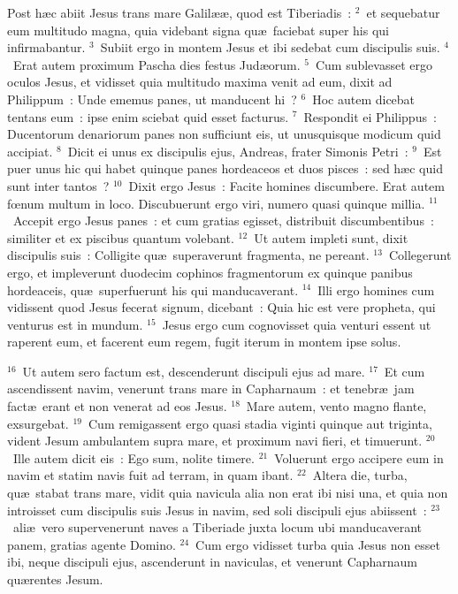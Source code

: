 \lettrine[lines=3,image=true,loversize=0.05,lraise=-0.03]{P}{}ost h\ae c abiit Jesus trans mare Galil\ae \ae , quod est Tiberiadis~:
${}^{2}$~et sequebatur eum multitudo magna, quia videbant signa qu\ae\ faciebat super his qui infirmabantur.
${}^{3}$~Subiit ergo in montem Jesus et ibi sedebat cum discipulis suis.
${}^{4}$~Erat autem proximum Pascha dies festus Jud\ae orum.
${}^{5}$~Cum sublevasset ergo oculos Jesus, et vidisset quia multitudo maxima venit ad eum, dixit ad Philippum~: Unde ememus panes, ut manducent hi~?
${}^{6}$~Hoc autem dicebat tentans eum~: ipse enim sciebat quid esset facturus.
${}^{7}$~Respondit ei Philippus~: Ducentorum denariorum panes non sufficiunt eis, ut unusquisque modicum quid accipiat.
${}^{8}$~Dicit ei unus ex discipulis ejus, Andreas, frater Simonis Petri~:
${}^{9}$~Est puer unus hic qui habet quinque panes hordeaceos et duos pisces~: sed h\ae c quid sunt inter tantos~?
${}^{10}$~Dixit ergo Jesus~: Facite homines discumbere. Erat autem fœnum multum in loco. Discubuerunt ergo viri, numero quasi quinque millia.
${}^{11}$~Accepit ergo Jesus panes~: et cum gratias egisset, distribuit discumbentibus~: similiter et ex piscibus quantum volebant.
${}^{12}$~Ut autem impleti sunt, dixit discipulis suis~: Colligite qu\ae\ superaverunt fragmenta, ne pereant.
${}^{13}$~Collegerunt ergo, et impleverunt duodecim cophinos fragmentorum ex quinque panibus hordeaceis, qu\ae\ superfuerunt his qui manducaverant.
${}^{14}$~Illi ergo homines cum vidissent quod Jesus fecerat signum, dicebant~: Quia hic est vere propheta, qui venturus est in mundum.
${}^{15}$~Jesus ergo cum cognovisset quia venturi essent ut raperent eum, et facerent eum regem, fugit iterum in montem ipse solus.


${}^{16}$~Ut autem sero factum est, descenderunt discipuli ejus ad mare.
${}^{17}$~Et cum ascendissent navim, venerunt trans mare in Capharnaum~: et tenebr\ae\ jam fact\ae\ erant et non venerat ad eos Jesus.
${}^{18}$~Mare autem, vento magno flante, exsurgebat.
${}^{19}$~Cum remigassent ergo quasi stadia viginti quinque aut triginta, vident Jesum ambulantem supra mare, et proximum navi fieri, et timuerunt.
${}^{20}$~Ille autem dicit eis~: Ego sum, nolite timere.
${}^{21}$~Voluerunt ergo accipere eum in navim et statim navis fuit ad terram, in quam ibant.
${}^{22}$~Altera die, turba, qu\ae\ stabat trans mare, vidit quia navicula alia non erat ibi nisi una, et quia non introisset cum discipulis suis Jesus in navim, sed soli discipuli ejus abiissent~:
${}^{23}$~ali\ae\ vero supervenerunt naves a Tiberiade juxta locum ubi manducaverant panem, gratias agente Domino.
${}^{24}$~Cum ergo vidisset turba quia Jesus non esset ibi, neque discipuli ejus, ascenderunt in naviculas, et venerunt Capharnaum qu\ae rentes Jesum.


